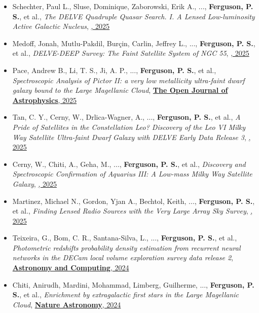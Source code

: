 \begin{itemize}[itemsep=1pt]
    \item {Schechter}, Paul L., {Sluse}, Dominique, {Zaborowski}, Erik A., ..., \textbf{Ferguson, P. S.}, et al., \textit{{The DELVE Quadruple Quasar Search. I. A Lensed Low-luminosity Active Galactic Nucleus}}, \href{https://ui.adsabs.harvard.edu/abs/2025AJ....170..241S}{\textbf{\aj}, 2025}
    \item {Medoff}, Jonah, {Mutlu-Pakdil}, Bur{\c{c}}in, {Carlin}, Jeffrey L., ..., \textbf{Ferguson, P. S.}, et al., \textit{{DELVE-DEEP Survey: The Faint Satellite System of NGC 55}}, \href{https://ui.adsabs.harvard.edu/abs/2025ApJ...990..108M}{\textbf{\apj}, 2025}
    \item {Pace}, Andrew B., {Li}, T. S., {Ji}, A. P., ..., \textbf{Ferguson, P. S.}, et al., \textit{{Spectroscopic Analysis of Pictor II: a very low metallicity ultra-faint dwarf galaxy bound to the Large Magellanic Cloud}}, \href{https://ui.adsabs.harvard.edu/abs/2025OJAp....8E.112P}{\textbf{The Open Journal of Astrophysics}, 2025}
    \item {Tan}, C. Y., {Cerny}, W., {Drlica-Wagner}, A., ..., \textbf{Ferguson, P. S.}, et al., \textit{{A Pride of Satellites in the Constellation Leo? Discovery of the Leo VI Milky Way Satellite Ultra-faint Dwarf Galaxy with DELVE Early Data Release 3}}, \href{https://ui.adsabs.harvard.edu/abs/2025ApJ...979..176T}{\textbf{\apj}, 2025}
    \item {Cerny}, W., {Chiti}, A., {Geha}, M., ..., \textbf{Ferguson, P. S.}, et al., \textit{{Discovery and Spectroscopic Confirmation of Aquarius III: A Low-mass Milky Way Satellite Galaxy}}, \href{https://ui.adsabs.harvard.edu/abs/2025ApJ...979..164C}{\textbf{\apj}, 2025}
    \item {Martinez}, Michael N., {Gordon}, Yjan A., {Bechtol}, Keith, ..., \textbf{Ferguson, P. S.}, et al., \textit{{Finding Lensed Radio Sources with the Very Large Array Sky Survey}}, \href{https://ui.adsabs.harvard.edu/abs/2025ApJ...979..132M}{\textbf{\apj}, 2025}
    \item {Teixeira}, G., {Bom}, C. R., {Santana-Silva}, L., ..., \textbf{Ferguson, P. S.}, et al., \textit{{Photometric redshifts probability density estimation from recurrent neural networks in the DECam local volume exploration survey data release 2}}, \href{https://ui.adsabs.harvard.edu/abs/2024A&C....4900886T}{\textbf{Astronomy and Computing}, 2024}
    \item {Chiti}, Anirudh, {Mardini}, Mohammad, {Limberg}, Guilherme, ..., \textbf{Ferguson, P. S.}, et al., \textit{{Enrichment by extragalactic first stars in the Large Magellanic Cloud}}, \href{https://ui.adsabs.harvard.edu/abs/2024NatAs...8..637C}{\textbf{Nature Astronomy}, 2024}

\end{itemize}
